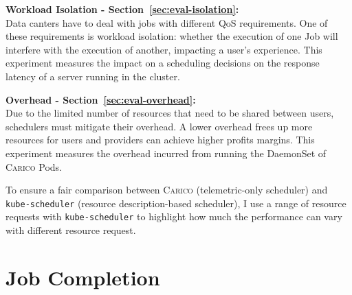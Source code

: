 \textbf{Workload Isolation - Section~\ref{sec:eval-isolation}:}\\
Data canters have to deal with jobs with different QoS requirements. One of
these requirements is workload isolation: whether the execution of one Job will
interfere with the execution of another, impacting a user's experience. This
experiment measures the impact on a scheduling decisions on the response latency
of a server running in the cluster.

\textbf{Overhead - Section~\ref{sec:eval-overhead}:}\\
Due to the limited number of resources that need to be shared between users,
schedulers must mitigate their overhead. A lower overhead frees up more
resources for users and providers can achieve higher profits margins. This
experiment measures the overhead incurred from running the DaemonSet of
\textsc{Carico} Pods.

To ensure a fair comparison between \textsc{Carico} (telemetric-only scheduler)
and \texttt{kube-scheduler} (resource description-based scheduler), I use a
range of resource requests with \texttt{kube-scheduler} to highlight how much
the performance can vary with different resource request.


\section{Job Completion}
\label{sec:eval-job-completion}

%

